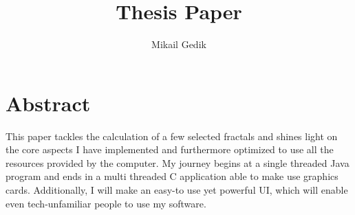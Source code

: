 \documentclass[10pt,a4paper,titlepage]{article}
\author{Mikail Gedik}
\title{Thesis Paper}
\begin{document}
	\maketitle
	\tableofcontents
	\listoffigures
	\clearpage
	\section{Abstract}
	This paper tackles the calculation of a few selected fractals and shines light on the core aspects I have implemented and furthermore optimized to use all the resources provided by the computer. My journey begins at a single threaded Java program and ends in a multi threaded C application able to make use graphics cards. Additionally, I will make an easy-to use yet powerful UI, which will enable even tech-unfamiliar people to use my software.
	
	
\end{document}
